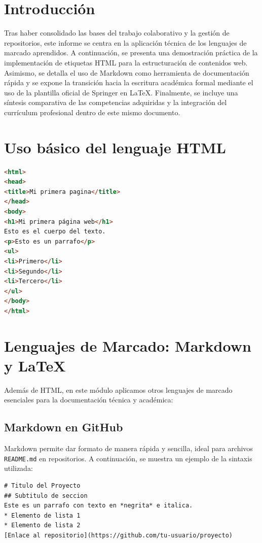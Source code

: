 \documentclass[runningheads]{llncs}
\begin{document}
\section{Introducción}
Tras haber consolidado las bases del trabajo colaborativo y la gestión de repositorios, este informe se centra en la aplicación técnica de los lenguajes de marcado aprendidos. A continuación, se presenta una demostración práctica de la implementación de etiquetas HTML para la estructuración de contenidos web. Asimismo, se detalla el uso de Markdown como herramienta de documentación rápida y se expone la transición hacia la escritura académica formal mediante el uso de la plantilla oficial de \cite{colabgithub}Springer en LaTeX. Finalmente, se incluye una síntesis comparativa de las competencias adquiridas y la integración del currículum profesional dentro de este mismo documento.

\section{Uso básico del lenguaje HTML}

\begin{lstlisting}[language=HTML]
<html>
<head>
<title>Mi primera pagina</title>
</head>
<body>
<h1>Mi primera página web</h1>
Esto es el cuerpo del texto.
<p>Esto es un parrafo</p>
<ul>
<li>Primero</li>
<li>Segundo</li>
<li>Tercero</li>
</ul>
</body>
</html>
\end{lstlisting}

\section{Lenguajes de Marcado: Markdown y LaTeX}

Además de HTML, en este módulo aplicamos otros lenguajes de marcado esenciales para la documentación técnica y académica:

\subsection{Markdown en GitHub}
Markdown permite dar formato de manera rápida y sencilla, ideal para archivos \texttt{README.md} en repositorios. A continuación, se muestra un ejemplo de la sintaxis utilizada:

\begin{lstlisting}[caption=Ejemplo de sintaxis Markdown]
# Titulo del Proyecto
## Subtitulo de seccion
Este es un parrafo con texto en *negrita* e italica.
* Elemento de lista 1
* Elemento de lista 2
[Enlace al repositorio](https://github.com/tu-usuario/proyecto)
\end{lstlisting}
\end{document}

